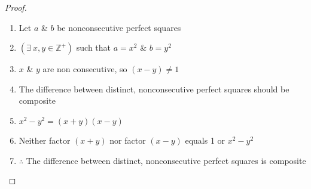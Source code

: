 \documentclass[11pt,oneside]{article}
\begin{document}
\begin{proof}
    \begin{enumerate}
        \item Let $a$ \& $b$ be nonconsecutive perfect squares
        \item $(\exists \  x,y \in \mathbb{Z}^+)$ such that $a = x^2$ \& $b=y^2$
        \item $x$ \& $y$ are non consecutive, so $(x-y) \neq 1$
        \item The difference between distinct, nonconsecutive perfect squares should be composite
        \item $x^2 - y^2 = (x + y)(x - y)$
        \item Neither factor $(x + y)$ nor factor $(x - y)$ equals 1 or $x^2 - y^2$
        \item $\therefore$ The difference between distinct, nonconsecutive perfect squares is composite
    \end{enumerate}
\end{proof}

\bigskip
\end{document}
